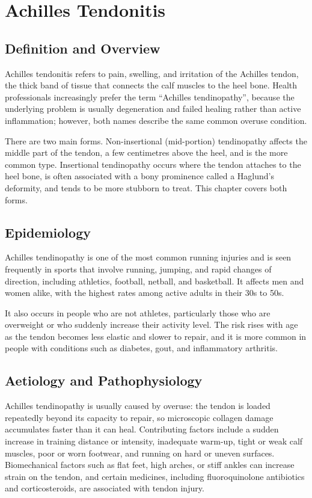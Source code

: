 \chapter{Achilles Tendonitis}

\section*{Definition and Overview}
Achilles tendonitis refers to pain, swelling, and irritation of the Achilles tendon, the thick band of tissue that connects the calf muscles to the heel bone. Health professionals increasingly prefer the term ``Achilles tendinopathy'', because the underlying problem is usually degeneration and failed healing rather than active inflammation; however, both names describe the same common overuse condition.

There are two main forms. Non-insertional (mid-portion) tendinopathy affects the middle part of the tendon, a few centimetres above the heel, and is the more common type. Insertional tendinopathy occurs where the tendon attaches to the heel bone, is often associated with a bony prominence called a Haglund's deformity, and tends to be more stubborn to treat. This chapter covers both forms.

\section*{Epidemiology}
Achilles tendinopathy is one of the most common running injuries and is seen frequently in sports that involve running, jumping, and rapid changes of direction, including athletics, football, netball, and basketball. It affects men and women alike, with the highest rates among active adults in their 30s to 50s.

It also occurs in people who are not athletes, particularly those who are overweight or who suddenly increase their activity level. The risk rises with age as the tendon becomes less elastic and slower to repair, and it is more common in people with conditions such as diabetes, gout, and inflammatory arthritis.

\section*{Aetiology and Pathophysiology}
Achilles tendinopathy is usually caused by overuse: the tendon is loaded repeatedly beyond its capacity to repair, so microscopic collagen damage accumulates faster than it can heal. Contributing factors include a sudden increase in training distance or intensity, inadequate warm-up, tight or weak calf muscles, poor or worn footwear, and running on hard or uneven surfaces. Biomechanical factors such as flat feet, high arches, or stiff ankles can increase strain on the tendon, and certain medicines, including fluoroquinolone antibiotics and corticosteroids, are associated with tendon injury.

